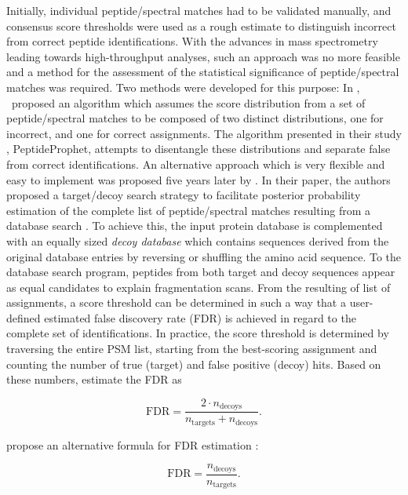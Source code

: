 Initially, individual peptide/spectral matches had to be validated manually,
and consensus score thresholds were used as a rough estimate to distinguish
incorrect from correct peptide identifications.
With the advances in mass spectrometry leading towards high-throughput analyses,
such an approach was no more feasible and a method for the assessment of
the statistical significance of peptide/spectral matches was required.
Two methods were developed for this purpose: 
In \citeyear{Keller2002}, \citeauthor{Keller2002}~proposed an algorithm which
assumes the score distribution from a set of 
peptide/spectral matches to be composed of two distinct distributions,
one for incorrect, and one for correct assignments. 
The algorithm presented in their study \citep{Keller2002}, PeptideProphet,
attempts to disentangle these distributions and separate false from correct
identifications.
An alternative approach which is very flexible and easy to implement was
proposed five years later by \citeauthor{Elias2007}.
In their paper, the authors proposed a target/decoy search strategy to 
facilitate posterior probability estimation of the complete list of
peptide/spectral matches resulting from a database search \citep{Elias2007}.
To achieve this, the input protein database is complemented with an equally 
sized {\em decoy database} which contains sequences derived from the original
database entries by reversing or shuffling the amino acid sequence.
To the database search program, peptides from both target and decoy sequences 
appear as equal candidates to explain fragmentation scans.
From the resulting of list of assignments, a score threshold can be determined
in such a way that a user-defined estimated false discovery rate (FDR) is
achieved in regard to the complete set of identifications.
In practice, the score threshold is determined by traversing the entire PSM 
list, starting from the best-scoring assignment and counting the number
of true (target) and false positive (decoy) hits.
Based on these numbers, \citeauthor{Elias2007} estimate the FDR as

\begin{equation}
\text{FDR} = \frac{2 \cdot n_{\text{decoys}}}{n_{\text{targets}} + n_{\text{decoys}}}.
\end{equation}

\citeauthor{Kall2008a} propose an alternative formula for FDR estimation 
\citep{Kall2008a}:

\begin{equation}
\text{FDR} = \frac{n_{\text{decoys}}}{n_{\text{targets}}}.
\end{equation}

